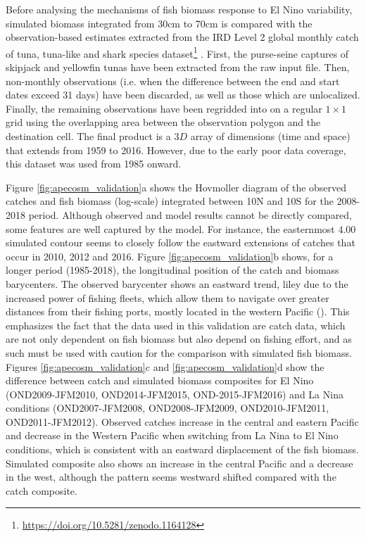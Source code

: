 Before analysing the mechanisms of fish biomass response to El Nino variability, simulated biomass integrated from 30cm to 70cm is compared with the observation-based estimates extracted from the IRD Level 2 global monthly catch of tuna, tuna-like and shark species dataset\footnote{\url{https://doi.org/10.5281/zenodo.1164128}} \citep{taconetGlobalMonthlyCatch2018}. First, the purse-seine captures of skipjack and yellowfin tunas have been extracted from the raw input file. Then, non-monthly observations (i.e. when the difference between the end and start dates exceed 31 days) have been discarded, as well as those which are unlocalized. Finally, the remaining observations have been regridded into on a regular $1 \times 1$ grid using the overlapping area between the observation polygon and the destination cell. The final product is a $3D$ array of dimensions (time and space) that extends from 1959 to 2016. However, due to the early poor data coverage, this dataset was used from 1985 onward.

Figure \ref{fig:apecosm_validation}a shows the Hovmoller diagram of the observed catches and fish biomass (log-scale) integrated between 10N and 10S for the 2008-2018 period. Although observed and model results cannot be directly compared, some features are well captured by the model. For instance, the easternmost $4.00$ simulated contour seems to closely follow the eastward extensions of catches that occur in 2010, 2012 and 2016. Figure \ref{fig:apecosm_validation}b shows, for a longer period (1985-2018), the longitudinal position of the catch and biomass barycenters. The observed barycenter shows an eastward trend, liley due to the increased power of fishing fleets, which allow them to navigate over greater distances from their fishing ports, mostly located in the western Pacific (). This emphasizes the fact that the data used in this validation are catch data, which are not only dependent on fish biomass but also depend on fishing effort, and as such must be used with caution for the comparison with simulated fish biomass. Figures \ref{fig:apecosm_validation}c and \ref{fig:apecosm_validation}d show the difference between catch and simulated biomass composites for El Nino (OND2009-JFM2010, OND2014-JFM2015, OND-2015-JFM2016) and La Nina conditions (OND2007-JFM2008, OND2008-JFM2009, OND2010-JFM2011, OND2011-JFM2012). Observed catches increase in the central and eastern Pacific and decrease in the Western Pacific when switching from La Nina to El Nino conditions, which is consistent with an eastward displacement of the fish biomass. Simulated composite also shows an increase in the central Pacific and a decrease in the west, although the pattern seems westward shifted compared with the catch composite. 

